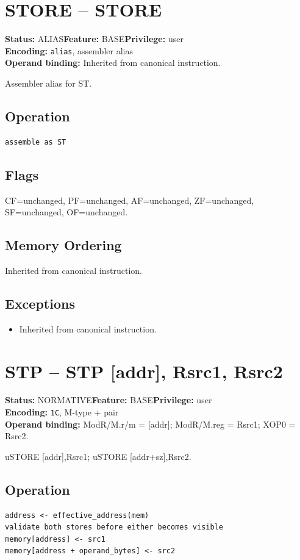 \documentclass[10pt]{article}
\begin{document}
\section{STORE -- STORE}
\textbf{Status:} ALIAS\quad \textbf{Feature:} BASE\quad \textbf{Privilege:} user\\
\textbf{Encoding:} \texttt{alias}, assembler alias\\
\textbf{Operand binding:} Inherited from canonical instruction.

Assembler alias for ST.

\subsection*{Operation}
\begin{lstlisting}
assemble as ST
\end{lstlisting}
\subsection*{Flags}
CF=unchanged, PF=unchanged, AF=unchanged, ZF=unchanged, SF=unchanged, OF=unchanged.
\subsection*{Memory Ordering}
Inherited from canonical instruction.
\subsection*{Exceptions}
\begin{itemize}
\item Inherited from canonical instruction.
\end{itemize}
\clearpage

\section{STP -- STP [addr], Rsrc1, Rsrc2}
\textbf{Status:} NORMATIVE\quad \textbf{Feature:} BASE\quad \textbf{Privilege:} user\\
\textbf{Encoding:} \texttt{1C}, M-type + pair\\
\textbf{Operand binding:} ModR/M.r/m = [addr]; ModR/M.reg = Rsrc1; XOP0 = Rsrc2.

uSTORE [addr],Rsrc1; uSTORE [addr+sz],Rsrc2.

\subsection*{Operation}
\begin{lstlisting}
address <- effective_address(mem)
validate both stores before either becomes visible
memory[address] <- src1
memory[address + operand_bytes] <- src2
\end{lstlisting}
\end{document}
